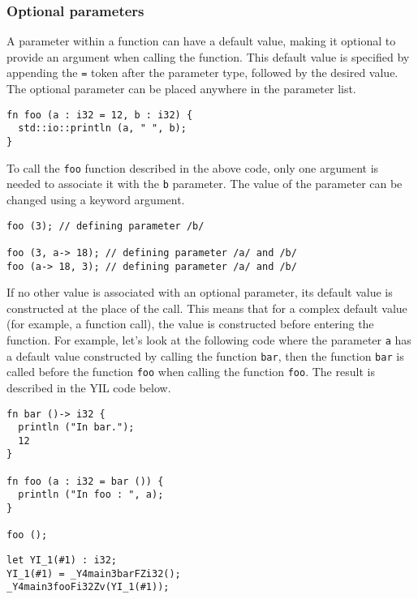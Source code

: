 \subsubsection {Optional parameters}

A parameter within a function can have a default value, making it optional to
provide an argument when calling the function. This default value is specified
by appending the \texttt{=} token after the parameter type, followed by the
desired value. The optional parameter can be placed anywhere in the parameter
list.

\begin{lstlisting}[style=coloredverbatim]
fn foo (a : i32 = 12, b : i32) {
  std::io::println (a, " ", b);
}
\end{lstlisting}

To call the \texttt{foo} function described in the above code, only one argument
is needed to associate it with the \texttt{b} parameter. The value of the
parameter can be changed using a keyword argument.

\begin{lstlisting}[style=coloredverbatim]
foo (3); // defining parameter /b/

foo (3, a-> 18); // defining parameter /a/ and /b/
foo (a-> 18, 3); // defining parameter /a/ and /b/
\end{lstlisting}

If no other value is associated with an optional parameter, its default value is
constructed at the place of the call. This means that for a complex default
value (for example, a function call), the value is constructed before entering
the function. For example, let's look at the following code where the parameter
\texttt{a} has a default value constructed by calling the function \texttt{bar},
then the function \texttt{bar} is called before the function \texttt{foo} when
calling the function \texttt{foo}. The result is described in the YIL code
below.

\begin{lstlisting}[style=coloredverbatim]
fn bar ()-> i32 {
  println ("In bar.");
  12
}

fn foo (a : i32 = bar ()) {
  println ("In foo : ", a);
}

foo ();
\end{lstlisting}

\begin{lstlisting}[style=intermediateVerb]
let YI_1(#1) : i32;
YI_1(#1) = _Y4main3barFZi32();
_Y4main3fooFi32Zv(YI_1(#1));
\end{lstlisting}

